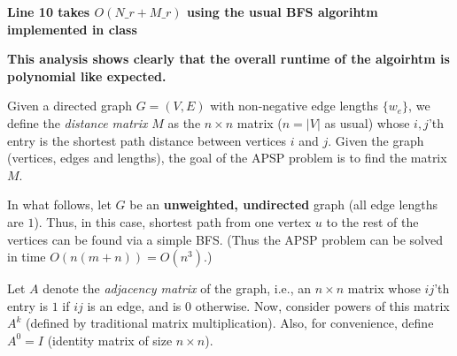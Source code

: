 \documentclass[addpoints]{exam}
\def\mysolution#1{}    %
\begin{document}
\begin{questions}
\textbf{Line 10 takes $O(N\_r + M\_r)$ using the usual BFS algorihtm implemented in class}

\textbf{This analysis shows clearly that the overall runtime of the algoirhtm is polynomial like expected.}

\mysolution{

}

Given a directed graph $G = (V, E)$ with non-negative edge lengths $\{w_e\}$, we define the {\em distance matrix} $M$ as the $n \times n$ matrix ($n = |V|$ as usual) whose $i,j$'th entry is the shortest path distance between vertices $i$ and $j$. Given the graph (vertices, edges and lengths), the goal of the APSP problem is to find the matrix $M$.

In what follows, let $G$ be an {\bf unweighted, undirected} graph (all edge lengths are $1$). Thus, in this case, shortest path from one vertex $u$ to the rest of the vertices can be found via a simple BFS. (Thus the APSP problem can be solved in time $O(n(m+n)) = O(n^3)$.)

Let $A$ denote the {\em adjacency matrix} of the graph, i.e., an $n \times n$ matrix whose $ij$'th entry is $1$ if $ij$ is an edge, and is $0$ otherwise.  Now, consider powers of this matrix $A^k$ (defined by traditional matrix multiplication).  Also, for convenience, define $A^0 = I$ (identity matrix of size $n\times n$). 

\end{questions}
\end{document}
